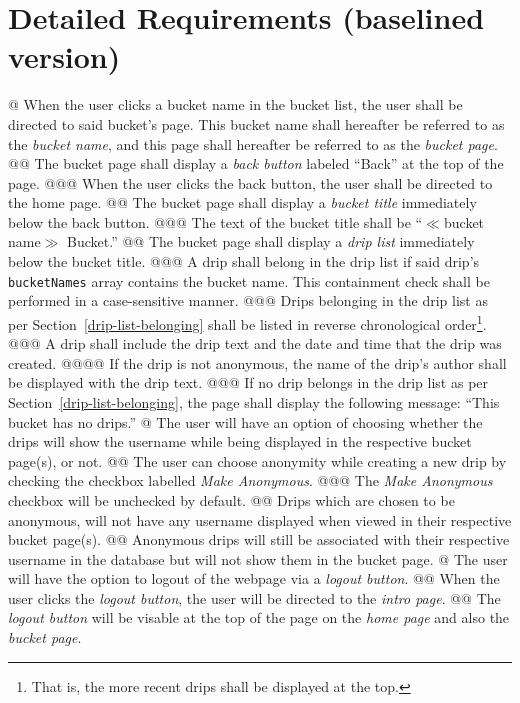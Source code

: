 \documentclass{article}
\begin{document}
\section*{Detailed Requirements (baselined version)}

\begin{easylist}[articletoc]
@ When the user clicks a bucket name in the bucket list, the user shall be directed to said bucket's page. This bucket name shall hereafter be referred to as the \textit{bucket name}, and this page shall hereafter be referred to as the \textit{bucket page}.
@@ The bucket page shall display a \textit{back button} labeled ``Back'' at the top of the page.
@@@ When the user clicks the back button, the user shall be directed to the home page.
@@ The bucket page shall display a \textit{bucket title} immediately below the back button.
@@@ The text of the bucket title shall be ``$\ll$bucket name$\gg$ Bucket.''
@@ The bucket page shall display a \textit{drip list} immediately below the bucket title.
@@@ \label{drip-list-belonging}A drip shall belong in the drip list if said drip's \texttt{bucketNames} array contains the bucket name. This containment check shall be performed in a case-sensitive manner.
@@@ Drips belonging in the drip list as per Section~\ref{drip-list-belonging} shall be listed in reverse chronological order\footnote{That is, the more recent drips shall be displayed at the top.}.
@@@ A drip shall include the drip text and the date and time that the drip was created.
@@@@ If the drip is not anonymous, the name of the drip's author shall be displayed with the drip text.
@@@ If no drip belongs in the drip list as per Section~\ref{drip-list-belonging}, the page shall display the following message: ``This bucket has no drips.''
@ The user will have an option of choosing whether the drips will show the username while being displayed in the respective bucket page(s), or not.
@@ The user can choose anonymity while creating a new drip by checking the checkbox labelled \textit{Make Anonymous}.
@@@ The \textit{Make Anonymous} checkbox will be unchecked by default.
@@ Drips which are chosen to be anonymous, will not have any username displayed when viewed in their respective bucket page(s).
@@ Anonymous drips will still be associated with their respective username in the database but will not show them in the bucket page.
@ The user will have the option to logout of the webpage via a \textit{logout button}.
@@ When the user clicks the \textit{logout button}, the user will be directed to the \textit{intro page}.
@@ The \textit{logout button} will be visable at the top of the page on the \textit{home page} and also the \textit{bucket page}.

\end{easylist}
\end{document}
